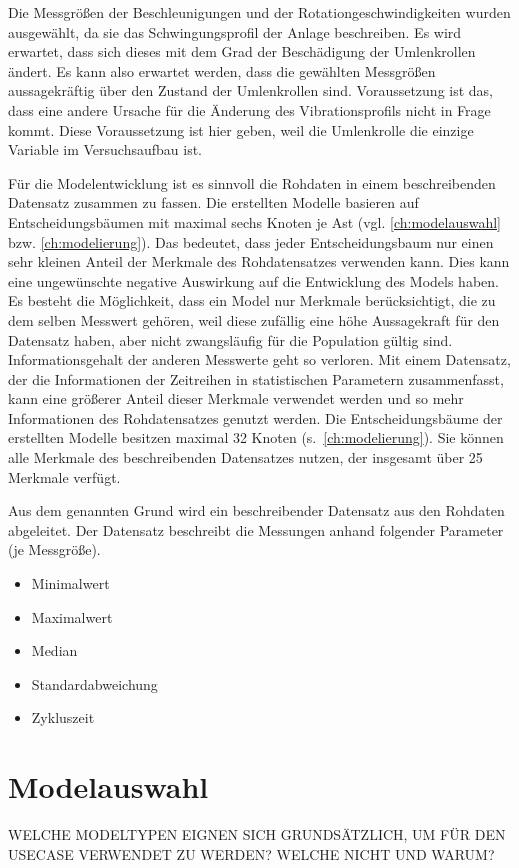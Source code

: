 Die Messgrößen der Beschleunigungen und der Rotationgeschwindigkeiten wurden ausgewählt, da sie das Schwingungsprofil der Anlage beschreiben. Es wird erwartet, dass sich dieses mit dem Grad der Beschädigung der Umlenkrollen ändert. Es kann also erwartet werden, dass die gewählten Messgrößen aussagekräftig über den Zustand der Umlenkrollen sind. Voraussetzung ist das, dass eine andere Ursache für die Änderung des Vibrationsprofils nicht in Frage kommt. Diese Voraussetzung ist hier geben, weil die Umlenkrolle die einzige Variable im Versuchsaufbau ist.

Für die Modelentwicklung ist es sinnvoll die Rohdaten in einem beschreibenden Datensatz zusammen zu fassen. Die erstellten Modelle basieren auf Entscheidungsbäumen mit maximal sechs Knoten je Ast (vgl. \cref{ch:modelauswahl} bzw. \cref{ch:modelierung}). Das bedeutet, dass jeder Entscheidungsbaum nur einen sehr kleinen Anteil der Merkmale des Rohdatensatzes verwenden kann. Dies kann eine ungewünschte negative Auswirkung auf die Entwicklung des Models haben. Es besteht die Möglichkeit, dass ein Model nur Merkmale berücksichtigt, die zu dem selben Messwert gehören, weil diese zufällig eine höhe Aussagekraft für den Datensatz haben, aber nicht zwangsläufig für die Population gültig sind. Informationsgehalt der anderen Messwerte geht so verloren. Mit einem Datensatz, der die Informationen der Zeitreihen in statistischen Parametern zusammenfasst, kann eine größerer Anteil dieser Merkmale verwendet werden und so mehr Informationen des Rohdatensatzes genutzt werden. Die Entscheidungsbäume der erstellten Modelle besitzen maximal \num{32} Knoten (s.~\cref{ch:modelierung}). Sie können alle Merkmale des beschreibenden Datensatzes nutzen, der insgesamt über \num{25} Merkmale verfügt.

Aus dem genannten Grund wird ein beschreibender Datensatz aus den Rohdaten abgeleitet. Der Datensatz beschreibt die Messungen anhand folgender Parameter (je Messgröße).
\begin{itemize}
	\item Minimalwert
	\item Maximalwert
	\item Median
	\item Standardabweichung
	\item Zykluszeit
\end{itemize}

\section{Modelauswahl}
\label{sec:modelauswahl}
WELCHE MODELTYPEN EIGNEN SICH GRUNDSÄTZLICH, UM FÜR DEN USECASE VERWENDET ZU WERDEN? WELCHE NICHT UND WARUM? 

